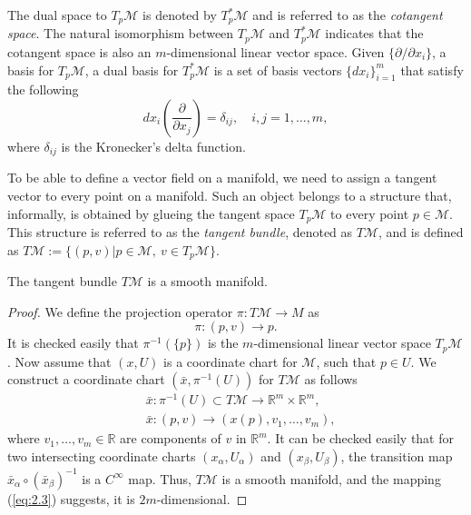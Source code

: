 The dual space to $T_p\mathcal M$ is denoted by $T_p^*\mathcal M$ and is referred to as the \emph{cotangent space}. The natural isomorphism between $T_p\mathcal M$ and $T_p^*\mathcal M$ indicates that the cotangent space is also an $m$-dimensional linear vector space. Given $\{ \partial /\partial x_i \}$, a basis for $T_p\mathcal M$, a dual basis for $T_p^*\mathcal M$ is a set of basis vectors $\{ dx_i \}_{i=1}^{m}$ that satisfy the following
\begin{equation} \label{eq:2.13}
	dx_i(\frac{\partial}{\partial x_j}) = \delta_{ij}, \quad i,j=1,\dots,m,
\end{equation}
where $\delta_{ij}$ is the Kronecker's delta function.

To be able to define a vector field on a manifold, we need to assign a tangent vector to every point on a manifold. Such an object belongs to a structure that, informally, is obtained by glueing the tangent space $T_p\mathcal M$ to every point $p\in \mathcal M$. This structure is referred to as the \emph{tangent bundle}, denoted as $T \mathcal M$, and is defined as $T \mathcal M := \{ (p,v) | p\in \mathcal M, \ v \in T_p \mathcal M\}$.
\begin{theorem} \label{theorem:2.1}
\cite{robbin2011introduction} The tangent bundle $T\mathcal M$ is a smooth manifold.
\end{theorem}

\begin{proof}
We define the projection operator $\pi:T\mathcal M \to M$ as
\begin{equation} \label{eq:2.2}
	\pi : (p,v) \to p.
\end{equation}
It is checked easily that $\pi^{-1}(\{p\})$ is the $m$-dimensional linear vector space $T_{p} \mathcal M$. Now assume that $(x,U)$ is a coordinate chart for $\mathcal M$, such that $p\in U$. We construct a coordinate chart $(\bar x , \pi^{-1}(U) )$ for $T\mathcal M$ as follows 
\begin{equation} \label{eq:2.3}
	\begin{aligned}
		&\bar x : \pi^{-1}(U) \subset T \mathcal M \to \mathbb R^m \times \mathbb R^m, \\
		&\bar x : (p,v) \to (x(p),v_1,\dots,v_m),
	\end{aligned}
\end{equation}
where $v_1,\dots,v_m\in \mathbb R$ are components of $v$ in $\mathbb R^m$. It can be checked easily that for two intersecting coordinate charts $(x_\alpha,U_\alpha)$ and $(x_\beta, U_\beta)$, the transition map $\bar x_{\alpha} \circ (\bar x_\beta)^{-1}$ is a $C^{\infty}$ map. Thus, $T \mathcal M$ is a smooth manifold, and the mapping (\ref{eq:2.3}) suggests, it is $2m$-dimensional.
\end{proof}

